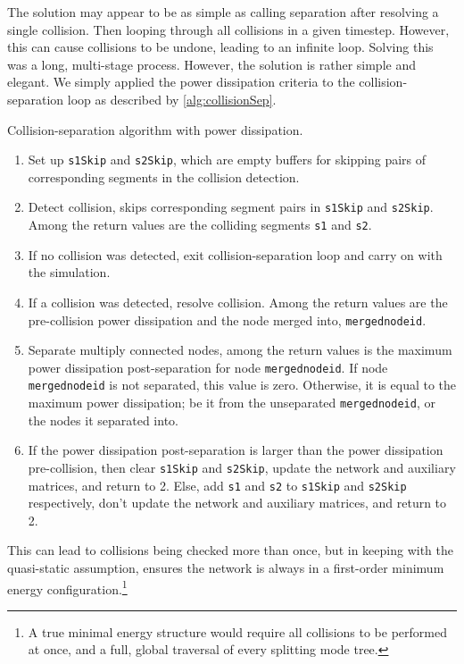 The solution may appear to be as simple as calling separation after resolving a single collision. Then looping through all collisions in a given timestep. However, this can cause collisions to be undone, leading to an infinite loop. Solving this was a long, multi-stage process. However, the solution is rather simple and elegant. We simply applied the power dissipation criteria to the collision-separation loop as described by \cref{alg:collisionSep}.
\begin{algorithm}
    \caption{Collision-separation algorithm with power dissipation.}
    \label{alg:collisionSep}
    \begin{enumerate}
        \item Set up \texttt{s1Skip} and \texttt{s2Skip}, which are empty buffers for skipping pairs of corresponding segments in the collision detection.
        \item Detect collision, skips corresponding segment pairs in \texttt{s1Skip} and \texttt{s2Skip}. Among the return values are the colliding segments \texttt{s1} and \texttt{s2}.
        \item If no collision was detected, exit collision-separation loop and carry on with the simulation.
        \item If a collision was detected, resolve collision. Among the return values are the pre-collision power dissipation and the node merged into, \texttt{mergednodeid}.
        \item Separate multiply connected nodes, among the return values is the maximum power dissipation post-separation for node \texttt{mergednodeid}. If node \texttt{mergednodeid} is not separated, this value is zero. Otherwise, it is equal to the maximum power dissipation; be it from the unseparated \texttt{mergednodeid}, or the nodes it separated into.
        \item If the power dissipation post-separation is larger than the power dissipation pre-collision, then clear \texttt{s1Skip} and \texttt{s2Skip}, update the network and auxiliary matrices, and return to 2. Else, add \texttt{s1} and \texttt{s2} to \texttt{s1Skip} and \texttt{s2Skip} respectively, don't update the network and auxiliary matrices, and return to 2.
    \end{enumerate}
\end{algorithm}

This can lead to collisions being checked more than once, but in keeping with the quasi-static assumption, ensures the network is always in a first-order minimum energy configuration.\footnote{A true minimal energy structure would require all collisions to be performed at once, and a full, global traversal of every splitting mode tree.}

